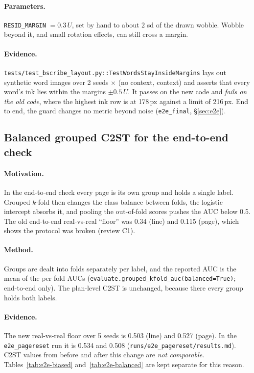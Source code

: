 \documentclass[11pt,a4paper]{article}
\newcommand{\U}{\ensuremath{U}}
\newcommand{\src}[1]{{\footnotesize\texttt{#1}}}
\begin{document}
\paragraph{Parameters.} \texttt{RESID\_MARGIN} $=0.3\,\U$, set by hand to
about 2 sd of the drawn wobble. Wobble beyond it, and small rotation effects,
can still cross a margin.

\paragraph{Evidence.} \texttt{tests/test\_bscribe\_layout.py::TestWordsStayInsideMargins}
lays out synthetic word images over 2 seeds $\times$ (no context, context) and
asserts that every word's ink lies within the margins $\pm0.5\,\U$. It passes
on the new code and \emph{fails on the old code}, where the highest ink row
is at 178\,px against a limit of 216\,px. End to end, the guard changes no
metric beyond noise (\texttt{e2e\_final}, \S\ref{sec:e2e}).

\subsection{Balanced grouped C2ST for the end-to-end check}
\label{sec:balanced}
\paragraph{Motivation.} In the end-to-end check every page is its own group and
holds a single label. Grouped $k$-fold then changes the class balance between
folds, the logistic intercept absorbs it, and pooling the out-of-fold scores
pushes the AUC below 0.5. The old end-to-end real-vs-real ``floor'' was 0.34
(line) and 0.115 (page), which shows the protocol was broken (review C1).

\paragraph{Method.} Groups are dealt into folds separately per label, and the
reported AUC is the mean of the per-fold AUCs
(\texttt{evaluate.grouped\_kfold\_auc(balanced=True)}; end-to-end only). The
plan-level C2ST is unchanged, because there every group holds both labels.

\paragraph{Evidence.} The new real-vs-real floor over 5 seeds is 0.503 (line)
and 0.527 (page). In the \texttt{e2e\_pagereset} run it is 0.534 and 0.508
(\src{runs/e2e\_pagereset/results.md}). C2ST values from before and after this
change are \emph{not comparable}. Tables~\ref{tab:e2e-biased}
and~\ref{tab:e2e-balanced} are kept separate for this reason.
\end{document}
